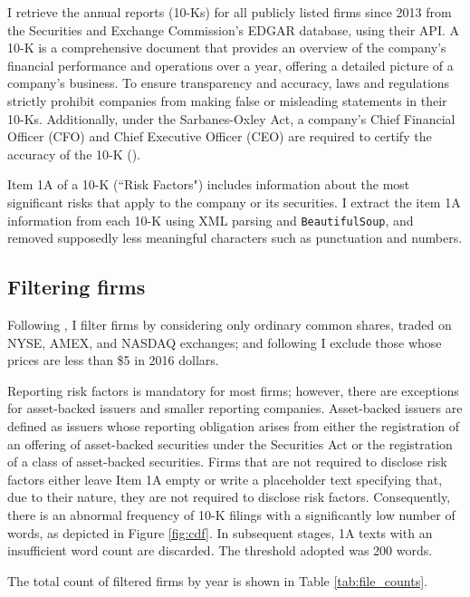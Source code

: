\documentclass[12pt, letterpaper]{article}
\begin{document}
I retrieve the annual reports (10-Ks) for all publicly listed firms since 2013 from the Securities and Exchange Commission's EDGAR database, using their API. A 10-K is a comprehensive document that provides an overview of the company's financial performance and operations over a year, offering a detailed picture of a company's business.  To ensure transparency and accuracy, laws and regulations strictly prohibit companies from making false or misleading statements in their 10-Ks. Additionally, under the Sarbanes-Oxley Act, a company's Chief Financial Officer (CFO) and Chief Executive Officer (CEO) are required to certify the accuracy of the 10-K (\cite{SEC_Office_of_Investor_Education_and_Advocacy2011-tw}).

Item 1A of a 10-K (``Risk Factors") includes information about the most significant risks that apply to the company or its securities.  I extract the item 1A information from each 10-K using XML parsing and \texttt{BeautifulSoup}, and removed supposedly less meaningful characters such as punctuation and numbers.

\subsection{Filtering firms}

Following \cite{Golubov2019-ku, Stambaugh2016-eb}, I filter firms by considering only ordinary common shares, traded on NYSE, AMEX, and NASDAQ exchanges; and following \cite{Stambaugh2016-eb} I exclude those whose prices are less than \$5 in 2016 dollars. 

Reporting risk factors is mandatory for most firms; however, there are exceptions for asset-backed issuers and smaller reporting companies. Asset-backed issuers are defined as issuers whose reporting obligation arises from either the registration of an offering of asset-backed securities under the Securities Act or the registration of a class of asset-backed securities. Firms that are not required to disclose risk factors either leave Item 1A empty or write a placeholder text specifying that, due to their nature, they are not required to disclose risk factors. Consequently, there is an abnormal frequency of 10-K filings with a significantly low number of words, as depicted in Figure \ref{fig:cdf}. In subsequent stages, 1A texts with an insufficient word count are discarded. The threshold adopted was 200 words. 

The total count of filtered firms by year is shown in Table \ref{tab:file_counts}.
\end{document}

